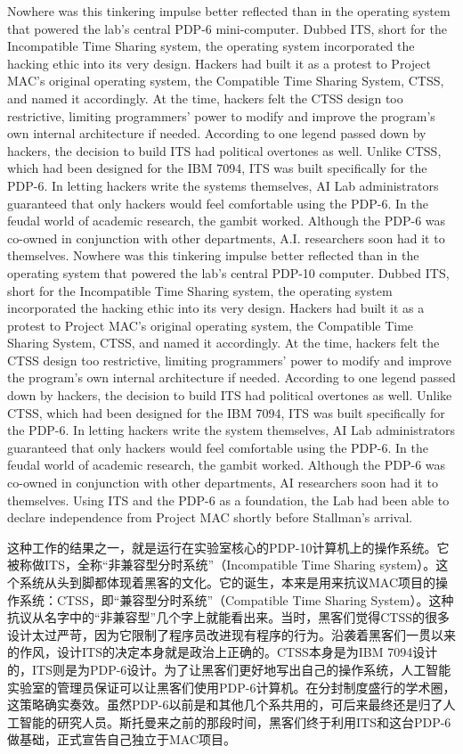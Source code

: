 \ifdefined\eng
\ifdefined\vone
Nowhere was this tinkering impulse better reflected than in the operating system that powered the lab's central PDP-6 mini-computer. Dubbed ITS, short for the Incompatible Time Sharing system, the operating system incorporated the hacking ethic into its very design. Hackers had built it as a protest to Project MAC's original operating system, the Compatible Time Sharing System, CTSS, and named it accordingly. At the time, hackers felt the CTSS design too restrictive, limiting programmers' power to modify and improve the program's own internal architecture if needed. According to one legend passed down by hackers, the decision to build ITS had political overtones as well. Unlike CTSS, which had been designed for the IBM 7094, ITS was built specifically for the PDP-6. In letting hackers write the systems themselves, AI Lab administrators guaranteed that only hackers would feel comfortable using the PDP-6. In the feudal world of academic research, the gambit worked. Although the PDP-6 was co-owned in conjunction with other departments, A.I. researchers soon had it to themselves.
\fi
\ifdefined\vtwo
Nowhere was this tinkering impulse better reflected than in the operating system that powered the lab's central PDP-10 computer. Dubbed ITS, short for the Incompatible Time Sharing system, the operating system incorporated the hacking ethic into its very design. Hackers had built it as a protest to Project MAC's original operating system, the Compatible Time Sharing System, CTSS, and named it accordingly. At the time, hackers felt the CTSS design too restrictive, limiting programmers' power to modify and improve the program's own internal architecture if needed. According to one legend passed down by hackers, the decision to build ITS had political overtones as well. Unlike CTSS, which had been designed for the IBM 7094, ITS was built specifically for the PDP-6. In letting hackers write the system themselves, AI Lab administrators guaranteed that only hackers would feel comfortable using the PDP-6. In the feudal world of academic research, the gambit worked. Although the PDP-6 was co-owned in conjunction with other departments, AI researchers soon had it to themselves.  Using ITS and the PDP-6 as a foundation, the Lab had been able to declare independence from Project MAC shortly before Stallman's arrival.
\fi
\fi

\ifdefined\chs
这种工作的结果之一，就是运行在实验室核心的PDP-10计算机上的操作系统。它被称做ITS，全称``非兼容型分时系统''（Incompatible Time Sharing system）。这个系统从头到脚都体现着黑客的文化。它的诞生，本来是用来抗议MAC项目的操作系统：CTSS，即``兼容型分时系统''（Compatible Time Sharing System）。这种抗议从名字中的``非兼容型''几个字上就能看出来。当时，黑客们觉得CTSS的很多设计太过严苛，因为它限制了程序员改进现有程序的行为。沿袭着黑客们一贯以来的作风，设计ITS的决定本身就是政治上正确的。CTSS本身是为IBM 7094设计的，ITS则是为PDP-6设计。为了让黑客们更好地写出自己的操作系统，人工智能实验室的管理员保证可以让黑客们使用PDP-6计算机。在分封制度盛行的学术圈，这策略确实奏效。虽然PDP-6以前是和其他几个系共用的，可后来最终还是归了人工智能的研究人员\ifdefined\vtwo。斯托曼来之前的那段时间，黑客们终于利用ITS和这台PDP-6做基础，正式宣告自己独立于MAC项目\fi{}。
\fi

